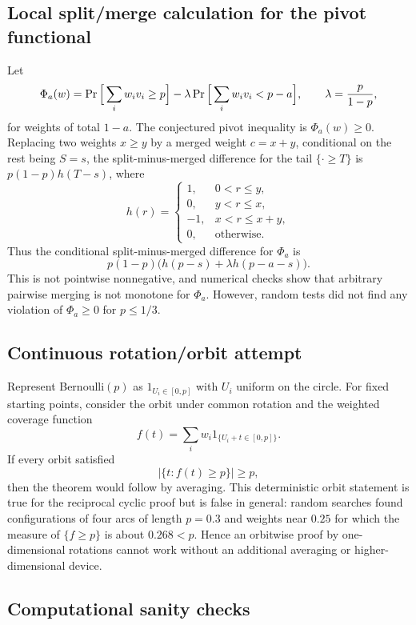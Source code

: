 \documentclass[12pt]{article}
\begin{document}
\subsection*{Local split/merge calculation for the pivot functional}

Let
\[
\Phi_a(w)=
\Pr\Big[\sum_i w_i v_i\ge p\Big]
-\lambda \Pr\Big[\sum_i w_i v_i<p-a\Big],
\qquad \lambda={p\over1-p},
\]
for weights of total \(1-a\).  The conjectured pivot inequality is
\(\Phi_a(w)\ge0\).  Replacing two weights \(x\ge y\) by a merged weight
\(c=x+y\), conditional on the rest being \(S=s\), the split-minus-merged
difference for the tail \(\{\cdot\ge T\}\) is \(p(1-p)h(T-s)\), where
\[
h(r)=
\begin{cases}
  1, & 0<r\le y,\\
  0, & y<r\le x,\\
 -1, & x<r\le x+y,\\
  0, & \text{otherwise}.
\end{cases}
\]
Thus the conditional split-minus-merged difference for \(\Phi_a\) is
\[
        p(1-p)\bigl(h(p-s)+\lambda h(p-a-s)\bigr).
\]
This is not pointwise nonnegative, and numerical checks show that arbitrary
pairwise merging is not monotone for \(\Phi_a\).  However, random tests did not
find any violation of \(\Phi_a\ge0\) for \(p\le1/3\).

\subsection*{Continuous rotation/orbit attempt}

Represent Bernoulli\((p)\) as \(1_{U_i\in[0,p]}\) with \(U_i\) uniform on the
circle.  For fixed starting points, consider the orbit under common rotation
and the weighted coverage function
\[
        f(t)=\sum_i w_i 1_{\{U_i+t\in[0,p]\}}.
\]
If every orbit satisfied
\[
        |\{t:f(t)\ge p\}|\ge p,
\]
then the theorem would follow by averaging.  This deterministic orbit
statement is true for the reciprocal cyclic proof but is false in general:
random searches found configurations of four arcs of length \(p=0.3\) and
weights near \(0.25\) for which the measure of \(\{f\ge p\}\) is about
\(0.268<p\).  Hence an orbitwise proof by one-dimensional rotations cannot
work without an additional averaging or higher-dimensional device.

\subsection*{Computational sanity checks}
\end{document}
